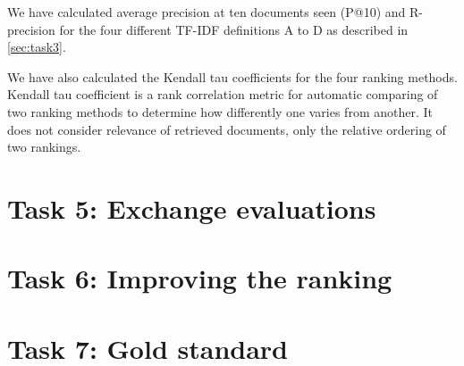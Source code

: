 We have calculated average precision at ten documents seen (P@10) and
R-precision for the four different TF-IDF definitions A to D as described in
\autoref{sec:task3}.

We have also calculated the Kendall tau coefficients for the four ranking
methods. Kendall tau coefficient is a rank correlation metric for automatic
comparing of two ranking methods to determine how differently one varies from
another. It does not consider relevance of retrieved documents, only the
relative ordering of two rankings.


\section{Task 5: Exchange evaluations}


\section{Task 6: Improving the ranking}


\section{Task 7: Gold standard}


